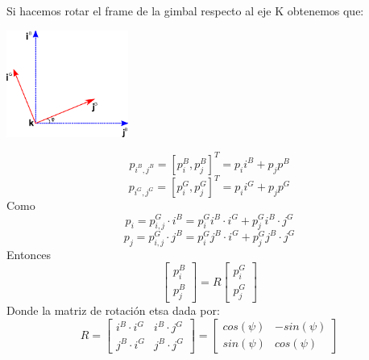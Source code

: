 Si hacemos rotar el frame de la gimbal respecto al eje K obtenemos que:
\begin{center}
	\includegraphics[width=0.3\textwidth]{Contenido/Cuerpo/Capitulo3/Fig9.eps}
	\label{fig:ModeloMat:Fig1}
\end{center}
\begin{equation}
	p_{i^B,j^B} = [p_i^B , p_j^B]^T = p_i i^B + p_j p^B
\end{equation}
\begin{equation}
	p_{i^G,j^G} = [p_i^G , p_j^G]^T = p_i i^G + p_j p^G
\end{equation}
Como
\begin{equation}
	p_i = p_{i,j}^G \cdot i^B = p_i^G i^B \cdot i^G + p_j^G i^B \cdot j^G
\end{equation}
\begin{equation}
	p_j = p_{i,j}^G \cdot j^B = p_i^G j^B \cdot i^G + p_j^G j^B \cdot j^G
\end{equation}
Entonces
\begin{equation*}
	\begin{bmatrix}
		p_i^B \\
		p_j^B
	\end{bmatrix}
	=
	R
	\begin{bmatrix}
		p_i^G \\
		p_j^G
	\end{bmatrix}
\end{equation*}
Donde la matriz de rotación etsa dada por:
\begin{equation*}
	R=
	\begin{bmatrix}
		i^B\cdot i^G & i^B \cdot j^G\\
		j^B\cdot i^G & j^B \cdot j^G
	\end{bmatrix}
	=
	\begin{bmatrix}
		cos(\psi) & -sin(\psi)\\
		sin(\psi) & cos(\psi)
	\end{bmatrix}
\end{equation*}